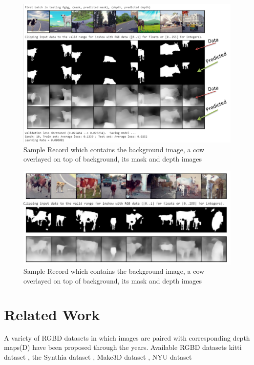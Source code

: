 \documentclass{article}
\begin{document}
\begin{figure}[h!]
\centering
  \includegraphics[width=1\textwidth]{finalepoch.png}
  \caption{Sample Record which contains the background image, a cow overlayed on top of background, its mask and depth images}
  \label{fig:samplerecord}
\end{figure}


\begin{figure}[h!]
\centering
  \includegraphics[width=1\textwidth]{unseen.jpeg}
  \caption{Sample Record which contains the background image, a cow overlayed on top of background, its mask and depth images}
  \label{fig:samplerecord}
\end{figure}


\section {Related Work}
A variety of RGBD datasets in which images are paired with corresponding depth maps(D) have been proposed through the years.
Available RGBD datasets
kitti dataset \cite{geiger2013vision}, the Synthia dataset \cite{ros2016synthia}, Make3D dataset \cite{saxena2008make3d}, NYU dataset \cite{silberman2012indoor}
\end{document}
